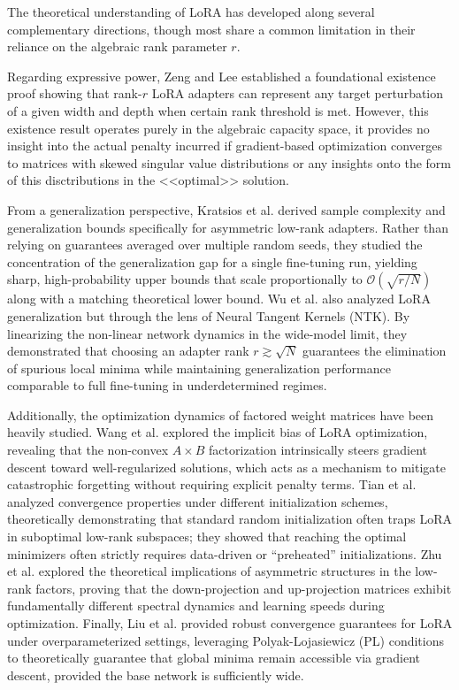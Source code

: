 \documentclass[a4paper,14pt]{extarticle}
\begin{document}
    The theoretical understanding of LoRA has developed along several complementary directions, though most share a common limitation in their reliance on the algebraic rank parameter $r$. 

    Regarding expressive power, Zeng and Lee \cite{zeng2024expressivepowerlowrankadaptation} established a foundational existence proof showing that rank-$r$ LoRA adapters can represent any target perturbation of a given width and depth when certain rank threshold is met. However, this existence result operates purely in the algebraic capacity space, it provides no insight into the actual penalty incurred if gradient-based optimization converges to matrices with skewed singular value distributions or any insights onto the form of this disctributions in the <<optimal>> solution. 
    
    From a generalization perspective, Kratsios et al. \cite{kratsios2025sharpgeneralizationboundsfoundation} derived sample complexity and generalization bounds specifically for asymmetric low-rank adapters. Rather than relying on guarantees averaged over multiple random seeds, they studied the concentration of the generalization gap for a single fine-tuning run, yielding sharp, high-probability upper bounds that scale proportionally to $\mathcal{O}(\sqrt{r/N})$ along with a matching theoretical lower bound. Wu et al. \cite{wu2024generalization} also analyzed LoRA generalization but through the lens of Neural Tangent Kernels (NTK). By linearizing the non-linear network dynamics in the wide-model limit, they demonstrated that choosing an adapter rank $r \gtrsim \sqrt{N}$ guarantees the elimination of spurious local minima while maintaining generalization performance comparable to full fine-tuning in underdetermined regimes. 

    Additionally, the optimization dynamics of factored weight matrices have been heavily studied. Wang et al. \cite{wang2024mechanism} explored the implicit bias of LoRA optimization, revealing that the non-convex $A \times B$ factorization intrinsically steers gradient descent toward well-regularized solutions, which acts as a mechanism to mitigate catastrophic forgetting without requiring explicit penalty terms. Tian et al. \cite{tian2024optimization} analyzed convergence properties under different initialization schemes, theoretically demonstrating that standard random initialization often traps LoRA in suboptimal low-rank subspaces; they showed that reaching the optimal minimizers often strictly requires data-driven or ``preheated'' initializations. Zhu et al. \cite{zhu2024asymmetry} explored the theoretical implications of asymmetric structures in the low-rank factors, proving that the down-projection and up-projection matrices exhibit fundamentally different spectral dynamics and learning speeds during optimization. Finally, Liu et al. \cite{liu2023convergence} provided robust convergence guarantees for LoRA under overparameterized settings, leveraging Polyak-Lojasiewicz (PL) conditions to theoretically guarantee that global minima remain accessible via gradient descent, provided the base network is sufficiently wide.
\end{document}
